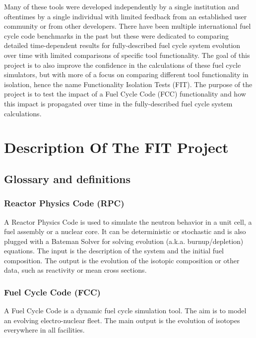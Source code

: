 \documentclass[review]{elsarticle}
\begin{document}
Many of these tools were developed independently by a single institution and oftentimes by a single individual with limited feedback from an established user community or from other developers. There have been multiple international fuel cycle code benchmarks in the past but these were dedicated to comparing detailed time-dependent results for fully-described fuel cycle system evolution over time with limited comparisons of specific tool functionality. The goal of this project is to also improve the confidence in the calculations of these fuel cycle simulators, but with more of a focus on comparing different tool functionality in isolation, hence the name Functionality Isolation Tests (FIT). The purpose of the project is to test the impact of a Fuel Cycle Code (FCC) functionality and how this impact is propagated over time in the fully-described fuel cycle system calculations.

\section{Description Of The FIT Project}
\subsection{Glossary and definitions}
\subsubsection{Reactor Physics Code (RPC)}

A Reactor Physics Code is used to simulate the neutron behavior in a unit cell, a fuel assembly or a nuclear core. It can be deterministic or stochastic and is also plugged with a Bateman Solver for solving evolution (a.k.a. burnup/depletion) equations. The input is the description of the system and the initial fuel composition. The output is the evolution of the isotopic composition or other data, such as reactivity or mean cross sections. 

\subsubsection{Fuel Cycle Code (FCC)}

A Fuel Cycle Code is a dynamic fuel cycle simulation tool. The aim is to model an evolving electro-nuclear fleet. The main output is the evolution of isotopes everywhere in all facilities.
\end{document}
